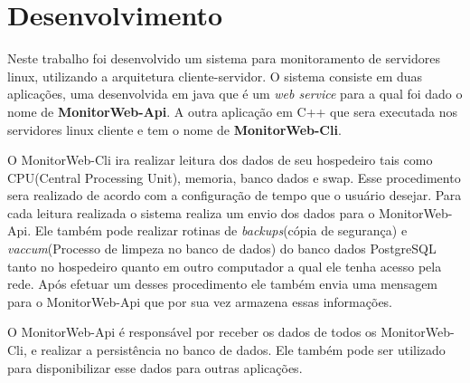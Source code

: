 
\chapter{Desenvolvimento}\label{cap:Desenvolvimento}

Neste trabalho foi desenvolvido um sistema para monitoramento de servidores linux, utilizando a arquitetura cliente-servidor.
O sistema consiste em duas aplicações, uma desenvolvida em java que é um \textit{web service} para a qual foi dado o nome de \textbf{MonitorWeb-Api}. A outra aplicação em C++ que sera executada nos servidores linux cliente e tem o nome de \textbf{MonitorWeb-Cli}.

O MonitorWeb-Cli ira realizar leitura dos dados de seu hospedeiro tais como CPU(Central Processing Unit), memoria, banco dados e swap. Esse procedimento sera realizado de acordo com a configuração de tempo que o usuário desejar. Para cada leitura realizada o sistema realiza um envio dos dados para o MonitorWeb-Api. Ele também pode realizar rotinas de \textit{backups}(cópia de segurança) e \textit{vaccum}(Processo de limpeza no banco de dados) do banco dados PostgreSQL tanto no hospedeiro quanto em outro computador a qual ele tenha acesso pela rede. Após efetuar um desses procedimento ele também envia uma mensagem para o MonitorWeb-Api que por sua vez armazena essas informações.

O MonitorWeb-Api é responsável por receber os dados de todos os MonitorWeb-Cli, e realizar a persistência no banco de dados. Ele também pode ser utilizado para disponibilizar esse dados para outras aplicações.



